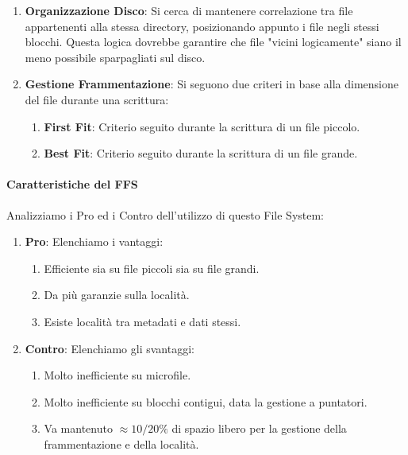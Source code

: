 \documentclass{article}
\begin{document}
\begin{enumerate}
    \item \textbf{Organizzazione Disco}: Si cerca di mantenere correlazione tra file appartenenti alla stessa directory, posizionando appunto i file negli stessi blocchi. Questa logica dovrebbe garantire che file "vicini logicamente" siano il meno possibile sparpagliati sul disco.
    \item \textbf{Gestione Frammentazione}: Si seguono due criteri in base alla dimensione del file durante una scrittura:
    \begin{enumerate}
        \item \textbf{First Fit}: Criterio seguito durante la scrittura di un file piccolo.
        \item \textbf{Best Fit}: Criterio seguito durante la scrittura di un file grande.
    \end{enumerate}
\end{enumerate}

\newpage

\paragraph{Caratteristiche del FFS} Analizziamo i Pro ed i Contro dell'utilizzo di questo File System:

\begin{enumerate}
    \item \textbf{Pro}: Elenchiamo i vantaggi:
    \begin{enumerate}
        \item Efficiente sia su file piccoli sia su file grandi.
        \item Da più garanzie sulla località.
        \item Esiste località tra metadati e dati stessi.
    \end{enumerate}
    \item \textbf{Contro}: Elenchiamo gli svantaggi:
    \begin{enumerate}
        \item Molto inefficiente su microfile.
        \item Molto inefficiente su blocchi contigui, data la gestione a puntatori.
        \item Va mantenuto $\approx 10/20 \%$ di spazio libero per la gestione della frammentazione e della località.
    \end{enumerate}
\end{enumerate}
\end{document}
